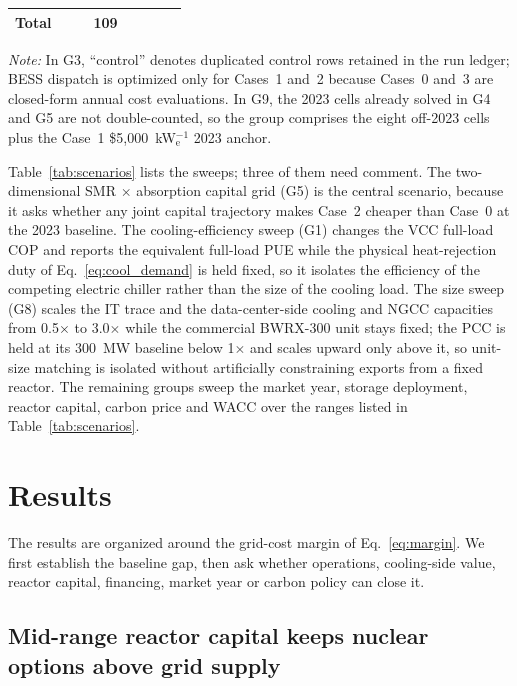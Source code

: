 \documentclass[a4paper,fleqn]{cas-sc}
\begin{document}
\begin{table}[pos=t]
\begin{tabularx}{\linewidth}{@{}llYrcccc@{}}
\midrule
Total &                 &                            & 109 & & & & \\
\bottomrule
\end{tabularx}
\begin{flushleft}
\footnotesize \textit{Note:} In G3, ``control'' denotes duplicated control rows retained in the run ledger; BESS dispatch is optimized only for Cases~1 and~2 because Cases~0 and~3 are closed-form annual cost evaluations. In G9, the 2023 cells already solved in G4 and G5 are not double-counted, so the group comprises the eight off-2023 cells plus the Case~1 \$5{,}000~kW$_\mathrm{e}^{-1}$ 2023 anchor.
\end{flushleft}
\end{table}

Table~\ref{tab:scenarios} lists the sweeps; three of them need comment. The two-dimensional SMR $\times$ absorption capital grid (G5) is the central scenario, because it asks whether any joint capital trajectory makes Case~2 cheaper than Case~0 at the 2023 baseline. The cooling-efficiency sweep (G1) changes the VCC full-load COP and reports the equivalent full-load PUE while the physical heat-rejection duty of Eq.~\eqref{eq:cool_demand} is held fixed, so it isolates the efficiency of the competing electric chiller rather than the size of the cooling load. The size sweep (G8) scales the IT trace and the data-center-side cooling and NGCC capacities from 0.5$\times$ to 3.0$\times$ while the commercial BWRX-300 unit stays fixed; the PCC is held at its 300~MW baseline below 1$\times$ and scales upward only above it, so unit-size matching is isolated without artificially constraining exports from a fixed reactor. The remaining groups sweep the market year, storage deployment, reactor capital, carbon price and WACC over the ranges listed in Table~\ref{tab:scenarios}.


\section{Results}
\label{sec:results}

The results are organized around the grid-cost margin of Eq.~\eqref{eq:margin}. We first establish the baseline gap, then ask whether operations, cooling-side value, reactor capital, financing, market year or carbon policy can close it.

\subsection{Mid-range reactor capital keeps nuclear options above grid supply}
\label{sec:results:baseline}
\end{document}
